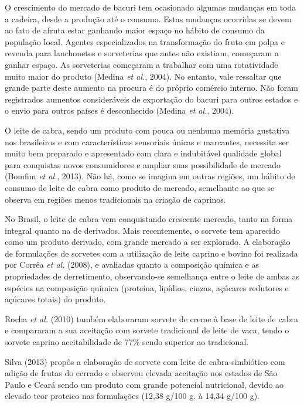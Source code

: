 \documentclass[10pt,a4paper]{article}
\begin{document}
O crescimento do mercado de bacuri tem ocasionado algumas mudanças em toda a cadeira, desde a produção até o consumo. Estas mudanças ocorridas se devem ao fato de afruta estar ganhando maior espaço no hábito de consumo da população local. Agentes especializados na transformação do fruto em polpa e revenda para lanchonetes e sorveterias que antes não existiam, começaram a ganhar espaço. As sorveterias começaram a trabalhar com uma rotatividade muito maior do produto (Medina \textit{et al.}, 2004). No entanto, vale ressaltar que grande parte deste aumento na procura é do próprio comércio interno. Não foram registrados aumentos consideráveis de exportação do bacuri para outros estados e o envio para outros países é desconhecido (Medina \textit{et al.}, 2004).

O leite de cabra, sendo um produto com pouca ou nenhuma memória gustativa nos brasileiros e com características sensoriais únicas e marcantes, necessita ser muito bem preparado e apresentado com clara e indubitável qualidade global para conquistas novos consumidores e ampliar suas possibilidade de mercado (Bomfim \textit{et al.}, 2013). Não há, como se imagina em outras regiões, um hábito de consumo de leite de cabra como produto de mercado, semelhante ao que se observa em regiões menos tradicionais na criação de caprinos. 

No Brasil, o leite de cabra vem conquistando crescente mercado, tanto na forma integral quanto na de derivados. Mais recentemente, o sorvete tem aparecido como um produto derivado, com grande mercado a ser explorado. A elaboração de formulações de sorvetes com a utilização de leite caprino e bovino foi realizada por Corrêa \textit{et al.} (2008), e avaliadas quanto a composição química e as propriedades de derretimento, observando-se semelhança entre o leite de ambas as espécies na composição química (proteína, lipídios, cinzas, açúcares redutores e açúcares totais) do produto.

Rocha \textit{et al.} (2010) também elaboraram sorvete de creme à base de leite de cabra e compararam a sua aceitação com sorvete tradicional de leite de vaca, tendo o sorvete caprino aceitabilidade de 77\% sendo superior ao tradicional.

Silva (2013) propôs a elaboração de sorvete com leite de cabra simbiótico com adição de frutas do cerrado e observou elevada aceitação nos estados de São Paulo e Ceará sendo um produto com grande potencial nutricional, devido ao elevado teor proteico nas formulações (12,38 g/100 g. à 14,34 g/100 g).
\end{document}
